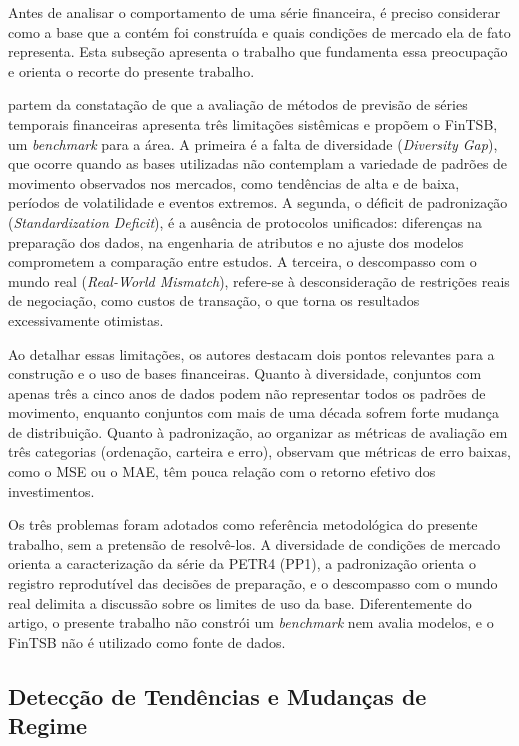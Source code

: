 \documentclass[12pt,a4paper]{article}
\begin{document}
Antes de analisar o comportamento de uma série financeira, é preciso considerar como a base que a contém foi construída e quais condições de mercado ela de fato representa. Esta subseção apresenta o trabalho que fundamenta essa preocupação e orienta o recorte do presente trabalho.

\textcite{hu_fintsb_2025} partem da constatação de que a avaliação de métodos de previsão de séries temporais financeiras apresenta três limitações sistêmicas e propõem o FinTSB, um \textit{benchmark} para a área. A primeira é a falta de diversidade (\textit{Diversity Gap}), que ocorre quando as bases utilizadas não contemplam a variedade de padrões de movimento observados nos mercados, como tendências de alta e de baixa, períodos de volatilidade e eventos extremos. A segunda, o déficit de padronização (\textit{Standardization Deficit}), é a ausência de protocolos unificados: diferenças na preparação dos dados, na engenharia de atributos e no ajuste dos modelos comprometem a comparação entre estudos. A terceira, o descompasso com o mundo real (\textit{Real-World Mismatch}), refere-se à desconsideração de restrições reais de negociação, como custos de transação, o que torna os resultados excessivamente otimistas.

Ao detalhar essas limitações, os autores destacam dois pontos relevantes para a construção e o uso de bases financeiras. Quanto à diversidade, conjuntos com apenas três a cinco anos de dados podem não representar todos os padrões de movimento, enquanto conjuntos com mais de uma década sofrem forte mudança de distribuição. Quanto à padronização, ao organizar as métricas de avaliação em três categorias (ordenação, carteira e erro), observam que métricas de erro baixas, como o MSE ou o MAE, têm pouca relação com o retorno efetivo dos investimentos.

Os três problemas foram adotados como referência metodológica do presente trabalho, sem a pretensão de resolvê-los. A diversidade de condições de mercado orienta a caracterização da série da PETR4 (PP1), a padronização orienta o registro reprodutível das decisões de preparação, e o descompasso com o mundo real delimita a discussão sobre os limites de uso da base. Diferentemente do artigo, o presente trabalho não constrói um \textit{benchmark} nem avalia modelos, e o FinTSB não é utilizado como fonte de dados.

\subsection{Detecção de Tendências e Mudanças de Regime}\label{sec:tr-tendencia}
\end{document}
